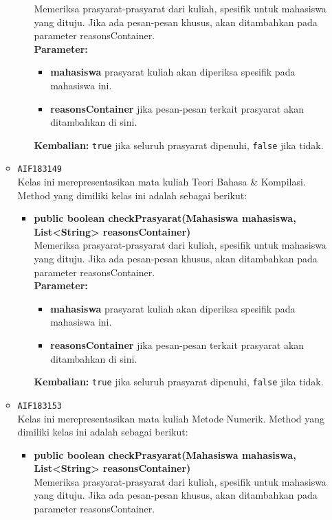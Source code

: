\begin{enumerate}
\begin{itemize}
\begin{itemize}
Memeriksa prasyarat-prasyarat dari kuliah, spesifik untuk mahasiswa yang dituju. Jika ada pesan-pesan khusus, akan ditambahkan pada parameter reasonsContainer.\\
\textbf{Parameter:}
\begin{itemize}
\item \textbf{mahasiswa} prasyarat kuliah akan diperiksa spesifik pada mahasiswa ini.
\item \textbf{reasonsContainer} jika pesan-pesan terkait prasyarat akan ditambahkan di sini.
\end{itemize}
\textbf{Kembalian:} \texttt{true} jika seluruh prasyarat dipenuhi, \texttt{false} jika tidak.
\end{itemize}
\item \texttt{AIF183149} \\
Kelas ini merepresentasikan mata kuliah Teori Bahasa \& Kompilasi. Method yang dimiliki kelas ini adalah sebagai berikut: 
\begin{itemize}
\item \textbf{public boolean checkPrasyarat(Mahasiswa mahasiswa, List<String> reasonsContainer)}\\
Memeriksa prasyarat-prasyarat dari kuliah, spesifik untuk mahasiswa yang dituju. Jika ada pesan-pesan khusus, akan ditambahkan pada parameter reasonsContainer.\\
\textbf{Parameter:}
\begin{itemize}
\item \textbf{mahasiswa} prasyarat kuliah akan diperiksa spesifik pada mahasiswa ini.
\item \textbf{reasonsContainer} jika pesan-pesan terkait prasyarat akan ditambahkan di sini.
\end{itemize}
\textbf{Kembalian:} \texttt{true} jika seluruh prasyarat dipenuhi, \texttt{false} jika tidak.
\end{itemize}
\item \texttt{AIF183153} \\
Kelas ini merepresentasikan mata kuliah Metode Numerik. Method yang dimiliki kelas ini adalah sebagai berikut: 
\begin{itemize}
\item \textbf{public boolean checkPrasyarat(Mahasiswa mahasiswa, List<String> reasonsContainer)}\\
Memeriksa prasyarat-prasyarat dari kuliah, spesifik untuk mahasiswa yang dituju. Jika ada pesan-pesan khusus, akan ditambahkan pada parameter reasonsContainer.\\

\end{itemize}
\end{itemize}
\end{enumerate}
